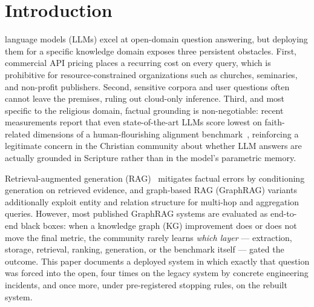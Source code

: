 
\section{Introduction}
\label{sec:intro}

 language models (LLMs) excel at open-domain question
answering, but deploying them for a specific knowledge domain exposes three
persistent obstacles. First, commercial API pricing places a recurring cost
on every query, which is prohibitive for resource-constrained organizations
such as churches, seminaries, and non-profit publishers. Second, sensitive
corpora and user questions often cannot leave the premises, ruling out
cloud-only inference. Third, and most specific to the religious domain,
factual grounding is non-negotiable: recent measurements report that even
state-of-the-art LLMs score lowest on faith-related dimensions of a
human-flourishing alignment benchmark~\cite{hilliard2025flourishing},
reinforcing a legitimate concern in the Christian community about whether
LLM answers are actually grounded in Scripture rather than in the model's
parametric memory.

Retrieval-augmented generation (RAG)~\cite{lewis2020rag} mitigates factual
errors by conditioning generation on retrieved evidence, and graph-based
RAG (GraphRAG) variants~\cite{edge2024graphrag,peng2026graphragsurvey}
additionally exploit entity and relation structure for multi-hop and
aggregation queries. However, most published GraphRAG systems are evaluated
as end-to-end black boxes: when a knowledge graph (KG) improvement does or
does not move the final metric, the community rarely learns \emph{which
layer} --- extraction, storage, retrieval, ranking, generation, or the
benchmark itself --- gated the outcome. This paper documents a deployed
system in which exactly that question was forced into the open, four
times on the legacy system by concrete engineering incidents, and once
more, under pre-registered stopping rules, on the rebuilt system.

